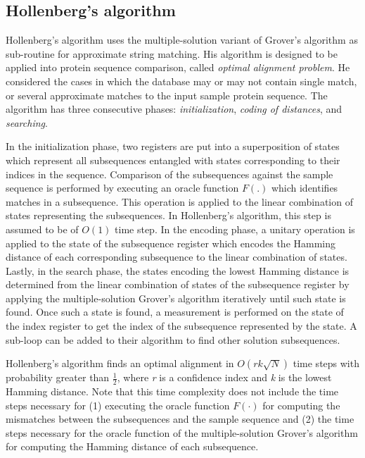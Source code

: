 \subsection{Hollenberg's algorithm}
Hollenberg's algorithm uses the multiple-solution variant of Grover's algorithm as sub-routine for approximate string matching. His algorithm is designed to be applied into protein sequence comparison, called \textit{optimal alignment problem}. He considered the cases in which the database may or may not contain single match, or several approximate matches to the input sample protein sequence. The algorithm has three consecutive phases: \textit{initialization}, \textit{coding of distances}, and \textit{searching}.

In the initialization phase, two registers are put into a superposition of states which represent all subsequences entangled with states corresponding to their indices in the sequence. Comparison of the subsequences against the sample sequence is performed by executing an oracle function $F(.)$ which identifies matches in a subsequence. This operation is applied to the linear combination of states representing the subsequences. In Hollenberg's algorithm, this step is assumed to be of $O(1)$ time step. In the encoding phase, a unitary operation is applied to the state of the subsequence register which encodes the Hamming distance of each corresponding subsequence to the linear combination of states. Lastly, in the search phase, the states encoding the lowest Hamming distance is determined from the linear combination of states of the subsequence register by applying the multiple-solution Grover's algorithm iteratively until such state is found. Once such a state is found, a measurement is performed on the state of the index register to get the index of the subsequence represented by the state. A sub-loop can be added to their algorithm to find other solution subsequences.

Hollenberg's algorithm finds an optimal alignment in $O(rk\sqrt{N})$ time steps with probability greater than $\frac{1}{2}$, where \textit{r} is a confidence index and \textit{k} is the lowest Hamming distance. Note that this time complexity does not include the time steps  necessary for (1) executing the oracle function $F(\cdot)$ for computing the mismatches between the subsequences and the sample sequence and (2) the time steps necessary for the oracle function of the multiple-solution Grover's algorithm for computing the Hamming distance of each subsequence.

